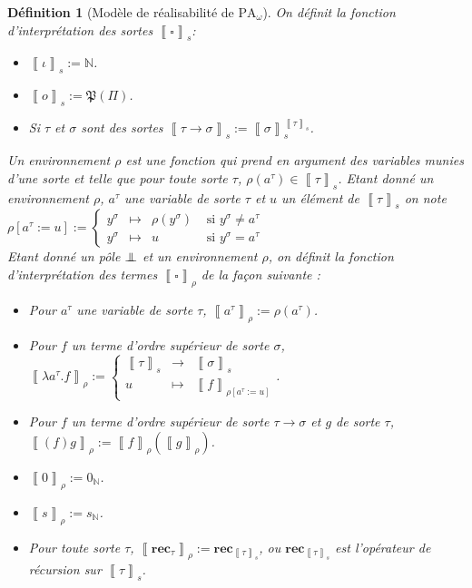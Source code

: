 \documentclass[a4paper,12pt]{article}
\newtheorem{defi}[theo]{Définition}
\theoremstyle{rmqstyle}
\newcommand{\N}{\mathbb{N}}
\newcommand{\itp}[1]{\left\llbracket#1\right\rrbracket}
\newcommand{\fundefdef}[3]{#1:= \left\{\begin{array}{ccc}#2\\#3\end{array}\right.}
\newcommand{\PA}{\mathrm{PA}}
\newcommand{\rec}{\mathbf{rec}}
\renewcommand{\P}{\mathfrak{P}}
\newcommand{\pole}{{\protect\mathpalette{\protect\polehelper}{\bot}}} \def\polehelper#1#2{\mathrel{\rlap{$#1#2$}\mkern3mu{#1#2}}}
\begin{document}
\begin{defi}[Modèle de réalisabilité de $\PA_\omega$]
On définit la fonction d'interprétation des sortes $\itp{\square}_s$: 
\begin{itemize}
\setlength\itemsep{ -1 em}
\item $\itp{\iota}_s := \N$.\\
\item $\itp{o}_s := \P(\Pi)$.\\
\item Si $\tau$ et $\sigma$ sont des sortes $\itp{\tau \to \sigma}_s := \itp{\sigma}_s^{\itp{\tau}_s}$.
\end{itemize}
Un environnement $\rho$ est une fonction qui prend en argument des variables munies d'une sorte et telle que pour toute sorte $\tau$, $\rho(a^\tau) \in \itp{\tau}_s$. Etant donné un environnement $\rho$, $a^\tau$ une variable de sorte $\tau$ et $u$ un élément de $\itp{\tau}_s$ on note $\rho[a^\tau := u] := 
\left\{\begin{array}{cccc}
y^\sigma& \mapsto& \rho(y^\sigma) &\text{ si } y^\sigma \neq a^\tau\\
y^\sigma& \mapsto& u                      &\text{ si } y^\sigma = a^\tau
\end{array}\right. $\\
Etant donné un pôle $\pole$ et un environnement $\rho$, on définit la fonction d'interprétation des termes $\itp{\square}_\rho$ de la façon suivante :
\begin{itemize}
\setlength\itemsep{ -1 em}
\item Pour $a^\tau$ une variable de sorte $\tau$, $\itp{a^\tau}_\rho := \rho(a^\tau)$.\\
\item Pour $f$ un terme d'ordre supérieur de sorte $\sigma$, $\fundefdef{\itp{\lambda a^\tau. f}_\rho}{\itp{\tau}_s& \to& \itp{\sigma}_s}{u& \mapsto& \itp{f}_{\rho[a^\tau := u]} }$.\\
\item Pour $f$ un terme d'ordre supérieur de sorte $\tau \to \sigma$ et $g$ de sorte $\tau$, $\itp{(f)g}_\rho := \itp{f}_\rho(\itp{g}_\rho)$.\\
\item $\itp{0}_\rho := 0_\N$.\\
\item $\itp{s}_\rho := s_\N$.\\
\item Pour toute sorte $\tau$, $\itp{\rec_\tau}_\rho := \rec_{\itp{\tau}_s}$, ou $\rec_{\itp{\tau}_s}$ est l'opérateur de récursion sur $\itp{\tau}_s$.\\

\end{itemize}
\end{defi}
\end{document}
